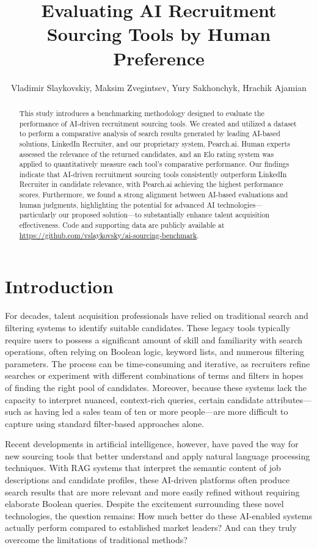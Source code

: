 \documentclass{article}
\title{Evaluating AI Recruitment Sourcing Tools by Human Preference}
\author{Vladimir Slaykovskiy, Maksim Zvegintsev, Yury Sakhonchyk, Hrachik Ajamian}
\begin{document}
\maketitle

\begin{abstract}
This study introduces a benchmarking methodology designed to evaluate the performance of AI-driven recruitment sourcing tools. We created and utilized a dataset to perform a comparative analysis of search results generated by leading AI-based solutions, LinkedIn Recruiter, and our proprietary system, Pearch.ai. Human experts assessed the relevance of the returned candidates, and an Elo rating system was applied to quantitatively measure each tool's comparative performance. Our findings indicate that AI-driven recruitment sourcing tools consistently outperform LinkedIn Recruiter in candidate relevance, with Pearch.ai achieving the highest performance scores. Furthermore, we found a strong alignment between AI-based evaluations and human judgments, highlighting the potential for advanced AI technologies—particularly our proposed solution—to substantially enhance talent acquisition effectiveness. Code and supporting data are publicly available at \href{https://github.com/vslaykovsky/ai-sourcing-benchmark}{https://github.com/vslaykovsky/ai-sourcing-benchmark}.

\end{abstract}


\section{Introduction}


For decades, talent acquisition professionals have relied on traditional search and filtering systems to identify suitable candidates. These legacy tools typically require users to possess a significant amount of skill and familiarity with search operations, often relying on Boolean logic, keyword lists, and numerous filtering parameters. The process can be time-consuming and iterative, as recruiters refine searches or experiment with different combinations of terms and filters in hopes of finding the right pool of candidates. Moreover, because these systems lack the capacity to interpret nuanced, context-rich queries, certain candidate attributes—such as having led a sales team of ten or more people—are more difficult to capture using standard filter-based approaches alone.

Recent developments in artificial intelligence, however, have paved the way for new sourcing tools that better understand and apply natural language processing techniques. With RAG systems \cite{lewis2020retrieval} that interpret the semantic content of job descriptions and candidate profiles, these AI-driven platforms often produce search results that are more relevant and more easily refined without requiring elaborate Boolean queries. Despite the excitement surrounding these novel technologies, the question remains: How much better do these AI-enabled systems actually perform compared to established market leaders? And can they truly overcome the limitations of traditional methods?
\end{document}
